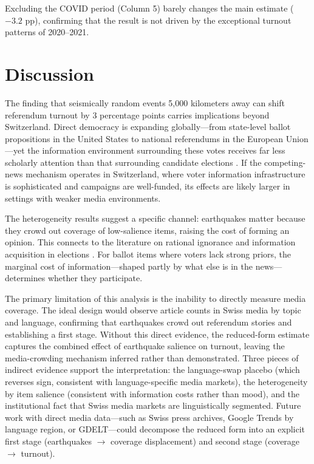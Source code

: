 \documentclass[12pt]{article}
\begin{document}
Excluding the COVID period (Column 5) barely changes the main estimate ($-3.2$ pp), confirming that the result is not driven by the exceptional turnout patterns of 2020--2021.

{\small}

\section{Discussion}

The finding that seismically random events 5,000 kilometers away can shift referendum turnout by 3 percentage points carries implications beyond Switzerland. Direct democracy is expanding globally---from state-level ballot propositions in the United States to national referendums in the European Union---yet the information environment surrounding these votes receives far less scholarly attention than that surrounding candidate elections \citep{lupia1998democratic, bowler2000informed}. If the competing-news mechanism operates in Switzerland, where voter information infrastructure is sophisticated and campaigns are well-funded, its effects are likely larger in settings with weaker media environments.

The heterogeneity results suggest a specific channel: earthquakes matter because they crowd out coverage of low-salience items, raising the cost of forming an opinion. This connects to the literature on rational ignorance \citep{downs1957economic} and information acquisition in elections \citep{matejka2015rational}. For ballot items where voters lack strong priors, the marginal cost of information---shaped partly by what else is in the news---determines whether they participate.

The primary limitation of this analysis is the inability to directly measure media coverage. The ideal design would observe article counts in Swiss media by topic and language, confirming that earthquakes crowd out referendum stories and establishing a first stage. Without this direct evidence, the reduced-form estimate captures the combined effect of earthquake salience on turnout, leaving the media-crowding mechanism inferred rather than demonstrated. Three pieces of indirect evidence support the interpretation: the language-swap placebo (which reverses sign, consistent with language-specific media markets), the heterogeneity by item salience (consistent with information costs rather than mood), and the institutional fact that Swiss media markets are linguistically segmented. Future work with direct media data---such as Swiss press archives, Google Trends by language region, or GDELT---could decompose the reduced form into an explicit first stage (earthquakes $\to$ coverage displacement) and second stage (coverage $\to$ turnout).
\end{document}
